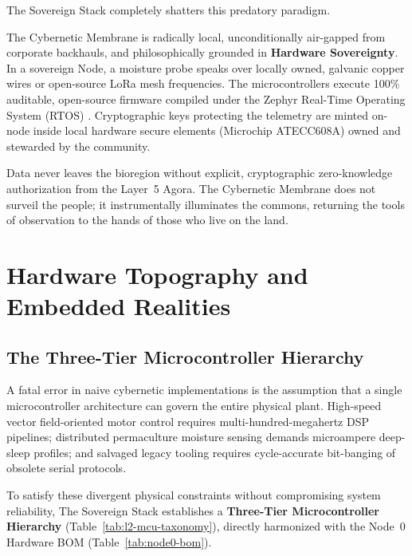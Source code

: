 The Sovereign Stack completely shatters this predatory paradigm. 

The Cybernetic Membrane is radically local, unconditionally air-gapped from corporate backhauls, and philosophically grounded in \textbf{Hardware Sovereignty}. In a sovereign Node, a moisture probe speaks over locally owned, galvanic copper wires or open-source LoRa mesh frequencies. The microcontrollers execute 100\% auditable, open-source firmware compiled under the Zephyr Real-Time Operating System (RTOS) \parencite{zephyr2024}. Cryptographic keys protecting the telemetry are minted on-node inside local hardware secure elements (Microchip ATECC608A) owned and stewarded by the community. 

Data never leaves the bioregion without explicit, cryptographic zero-knowledge authorization from the Layer~5 Agora. The Cybernetic Membrane does not surveil the people; it instrumentally illuminates the commons, returning the tools of observation to the hands of those who live on the land.

\section{Hardware Topography and Embedded Realities}
\label{sec:l2_hardware_topography}

\subsection{The Three-Tier Microcontroller Hierarchy}

A fatal error in naive cybernetic implementations is the assumption that a single microcontroller architecture can govern the entire physical plant. High-speed vector field-oriented motor control requires multi-hundred-megahertz DSP pipelines; distributed permaculture moisture sensing demands microampere deep-sleep profiles; and salvaged legacy tooling requires cycle-accurate bit-banging of obsolete serial protocols. 

To satisfy these divergent physical constraints without compromising system reliability, The Sovereign Stack establishes a \textbf{Three-Tier Microcontroller Hierarchy} (Table~\ref{tab:l2-mcu-taxonomy}), directly harmonized with the Node~0 Hardware BOM (Table~\ref{tab:node0-bom}).

